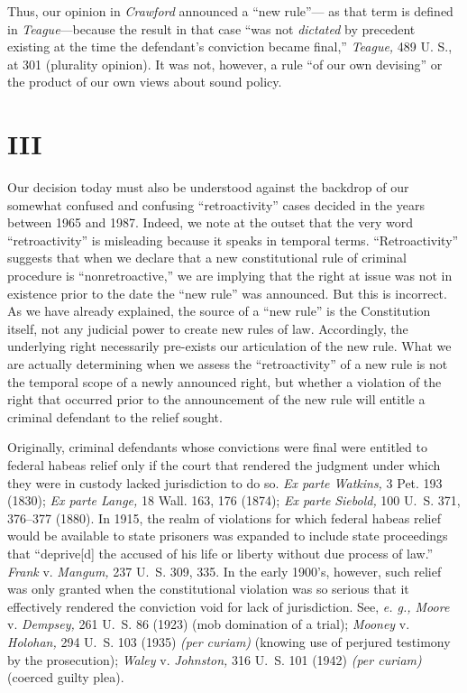   Thus, our opinion in \emph{Crawford} announced a ``new rule''---
as that term is defined in \emph{Teague}---because the result in that
case ``was not \emph{dictated} by precedent existing at the time the
defendant's conviction became final,'' \emph{Teague,} 489 U. S., at
301 (plurality opinion). It was not, however, a rule ``of our \newpage 
own devising'' or the product of our own views about sound policy.


\section{III}

  Our decision today must also be understood against the backdrop of
our somewhat confused and confusing ``retroactivity'' cases decided
in the years between 1965 and 1987. Indeed, we note at the outset that
the very word ``retroactivity'' is misleading because it speaks in
temporal terms. ``Retroactivity'' suggests that when we declare that a
new constitutional rule of criminal procedure is ``nonretroactive,''
we are implying that the right at issue was not in existence prior
to the date the ``new rule'' was announced. But this is incorrect.
As we have already explained, the source of a ``new rule'' is the
Constitution itself, not any judicial power to create new rules of
law. Accordingly, the underlying right necessarily pre-exists our
articulation of the new rule. What we are actually determining when
we assess the ``retroactivity'' of a new rule is not the temporal
scope of a newly announced right, but whether a violation of the right
that occurred prior to the announcement of the new rule will entitle a
criminal defendant to the relief sought.\footnotemark[5]

  Originally, criminal defendants whose convictions were final were
entitled to federal habeas relief only if the court that rendered the
judgment under which they were in custody lacked jurisdiction to do
so. \emph{Ex parte Watkins,} 3 Pet. 193 (1830); \emph{Ex parte Lange,} 18
Wall. 163, 176 (1874); \emph{Ex parte} \newpage  \emph{Siebold,} 100 U.~S. 371,
376--377 (1880). In 1915, the realm of violations for which federal
habeas relief would be available to state prisoners was expanded to
include state proceedings that ``deprive[d] the accused of his life
or liberty without due process of law.'' \emph{Frank} v. \emph{Mangum,}
237 U.~S. 309, 335. In the early 1900's, however, such relief was
only granted when the constitutional violation was so serious that it
effectively rendered the conviction void for lack of jurisdiction.
See, \emph{e. g., Moore} v. \emph{Dempsey,} 261 U.~S. 86 (1923) (mob
domination of a trial); \emph{Mooney} v. \emph{Holohan,} 294 U.~S. 103 (1935)
\emph{(per curiam)} (knowing use of perjured testimony by the prosecution);
\emph{Waley} v. \emph{Johnston,} 316 U.~S. 101 (1942) \emph{(per curiam)}
(coerced guilty plea).\footnotemark[7]

